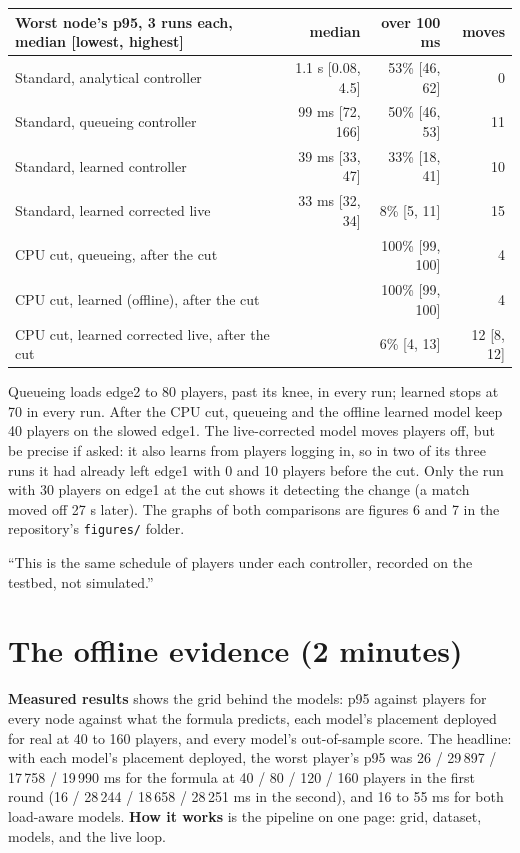 \documentclass[11pt,a4paper]{article}
\newcommand{\ui}[1]{\textbf{#1}}
\begin{document}
\begin{center}\small
\begin{tabularx}{\linewidth}{@{}Xrrr@{}}
\toprule
\textbf{Worst node's p95, 3 runs each, median [lowest, highest]} & \textbf{median} & \textbf{over 100 ms} & \textbf{moves} \\
\midrule
Standard, analytical controller & 1.1 s [0.08, 4.5] & 53\% [46, 62] & 0 \\
Standard, queueing controller & 99 ms [72, 166] & 50\% [46, 53] & 11 \\
Standard, learned controller & 39 ms [33, 47] & 33\% [18, 41] & 10 \\
Standard, learned corrected live & 33 ms [32, 34] & 8\% [5, 11] & 15 \\
\addlinespace
CPU cut, queueing, after the cut & & 100\% [99, 100] & 4 \\
CPU cut, learned (offline), after the cut & & 100\% [99, 100] & 4 \\
CPU cut, learned corrected live, after the cut & & 6\% [4, 13] & 12 [8, 12] \\
\bottomrule
\end{tabularx}
\end{center}
Queueing loads edge2 to 80 players, past its knee, in every run; learned
stops at 70 in every run. After the CPU cut, queueing and the offline learned
model keep 40 players on the slowed edge1. The live-corrected model moves
players off, but be precise if asked: it also learns from players logging in,
so in two of its three runs it had already left edge1 with 0 and 10 players
before the cut. Only the run with 30 players on edge1 at the cut shows it
detecting the change (a match moved off 27 s later).
The graphs of both comparisons are figures 6 and 7 in the repository's
\texttt{figures/} folder.

\begin{sayit}
``This is the same schedule of players under each controller, recorded on the
testbed, not simulated.''
\end{sayit}

\section{The offline evidence (2 minutes)}

\ui{Measured results} shows the grid behind the models: p95 against players
for every node against what the formula predicts, each model's placement
deployed for real at 40 to 160 players, and every model's out-of-sample
score. The headline: with each model's placement deployed, the worst player's
p95 was 26 / 29\,897 / 17\,758 / 19\,990 ms for the formula at 40 / 80 / 120 /
160 players in the first round (16 / 28\,244 / 18\,658 / 28\,251 ms in the
second), and 16 to 55 ms for both load-aware models. \ui{How it works}
is the pipeline on one page: grid, dataset, models, and the live loop.
\end{document}
